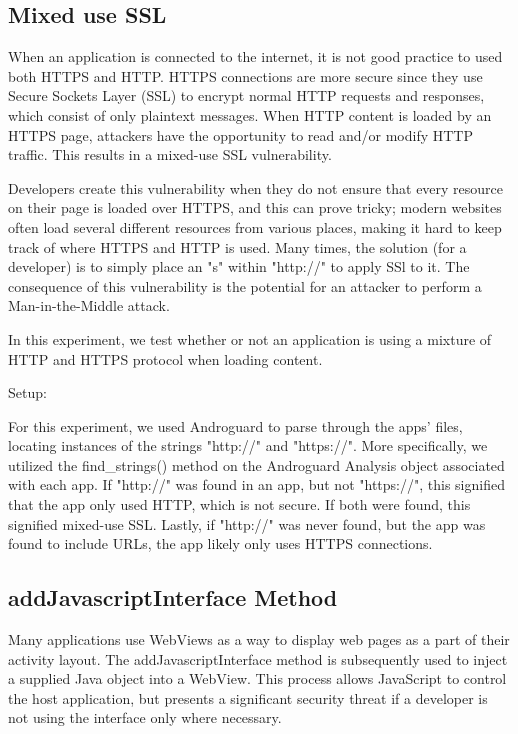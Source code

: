     \subsection{Mixed use SSL}

        When an application is connected to the internet, it is not 
        good practice to used both HTTPS and HTTP. HTTPS connections 
        are more secure since they use Secure Sockets Layer (SSL) to 
        encrypt normal HTTP requests and responses, which consist of 
        only plaintext messages. When HTTP content is loaded by an 
        HTTPS page, attackers have the opportunity to read and/or modify
        HTTP traffic. This results in a mixed-use SSL vulnerability.

        Developers create this vulnerability when they do not ensure 
        that every resource on their page is loaded over HTTPS, and 
        this can prove tricky; modern websites often load several 
        different resources from various places, making it hard to 
        keep track of where HTTPS and HTTP is used. Many times, the 
        solution (for a developer) is to simply place an "s" within 
        "http://" to apply SSl to it. The consequence of this vulnerability 
        is the potential for an attacker to perform a Man-in-the-Middle 
        attack.

        In this experiment, we test whether or not an application is 
        using a mixture of HTTP and HTTPS protocol when loading content.

        Setup:

        For this experiment, we used Androguard to parse through the apps' 
        files, locating instances of the strings "http://" and "https://". 
        More specifically, we utilized the find\_strings() method on the Androguard 
        Analysis object associated with each app. If "http://" was found in an app, but not "https://", this signified 
        that the app only used HTTP, which is not secure. If both were found, 
        this signified mixed-use SSL. Lastly, if "http://" was never found, but 
        the app was found to include URLs, the app likely only uses 
        HTTPS connections.

    \subsection{addJavascriptInterface Method}

        Many applications use WebViews as a way to display web pages as a 
        part of their activity layout. The addJavascriptInterface method 
        is subsequently used to inject a supplied Java object into a WebView. 
        This process allows JavaScript to control the host application, 
        but presents a significant security threat if a developer is not 
        using the interface only where necessary. 

